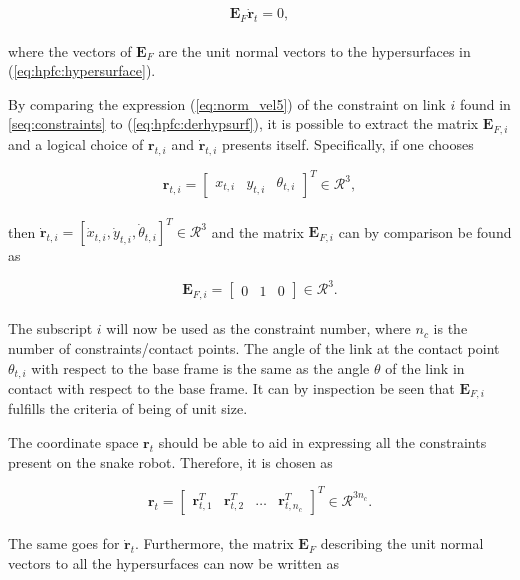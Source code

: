 \begin{equation}\label{eq:hpfc:derhypsurf}
    \mathbf{E}_F \mathbf{\dot{r}}_t = 0,
\end{equation}
\\
where the vectors of $\mathbf{E}_F$ are the unit normal vectors to the hypersurfaces in (\ref{eq:hpfc:hypersurface}).

By comparing the expression (\ref{eq:norm_vel5}) of the constraint on link $i$ found in \ref{seq:constraints} to (\ref{eq:hpfc:derhypsurf}), it is possible to extract the matrix $\mathbf{E}_{F,i}$ and a logical choice of $\mathbf{r}_{t,i}$ and $\mathbf{\dot{r}}_{t,i}$ presents itself.
Specifically, if one chooses

\begin{equation}
    \mathbf{r}_{t,i} =
    \begin{bmatrix}
        x_{t,i} & y_{t,i} & \theta_{t,i}
    \end{bmatrix}^T \in \mathcal{R}^3,
\end{equation}
\\
then $\mathbf{\dot{r}}_{t,i} = [\dot{x}_{t,i}, \dot{y}_{t,i}, \dot{\theta}_{t,i}]^T \in \mathcal{R}^3$ and the matrix $\mathbf{E}_{F,i}$ can by comparison be found as

\begin{equation}
    \mathbf{E}_{F,i} =
    \begin{bmatrix}
        0 & 1 & 0
    \end{bmatrix} \in \mathcal{R}^3.
\end{equation}
\\
The subscript $i$ will now be used as the constraint number, where $n_c$ is the number of constraints/contact points.
The angle of the link at the contact point $\theta_{t,i}$ with respect to the base frame is the same as the angle $\theta$ of the link in contact with respect to the base frame. It can by inspection be seen that $\mathbf{E}_{F,i}$ fulfills the criteria of being of unit size.


The coordinate space $\mathbf{r}_t$ should be able to aid in expressing all the constraints present on the snake robot. Therefore, it is chosen as 

\begin{equation}
    \mathbf{r}_t = 
    \begin{bmatrix}
        \mathbf{r}_{t,1}^T & \mathbf{r}_{t,2}^T & \dots &\mathbf{r}_{t,n_c}^T
    \end{bmatrix}^T \in \mathcal{R}^{3 n_c}.
\end{equation}
\\
The same goes for $\dot{\mathbf{r}}_t$. Furthermore, the matrix $\mathbf{E}_{F}$ describing the unit normal vectors to all the hypersurfaces can now be written as


